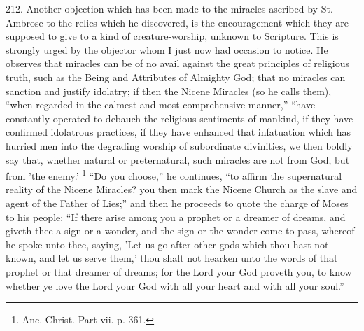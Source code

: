 212.
Another objection which has been made to the miracles ascribed by St.
Ambrose to the relics which he discovered, is the encouragement which
they are supposed to give to a kind of creature-worship, unknown to
Scripture. This is strongly urged by the objector whom I just now had
occasion to notice. He observes that miracles can be of no avail
against the great principles of religious truth, such as the Being and
Attributes of Almighty God; that no miracles can sanction and justify
idolatry; if then the Nicene Miracles (so he calls them), ``when
regarded in the calmest and most comprehensive manner,'' ``have
constantly operated to debauch the religious sentiments of mankind, if
they have confirmed idolatrous practices, if they have enhanced that
infatuation which has hurried men into the degrading worship of
subordinate divinities, we then boldly say that, whether natural or
preternatural, such miracles are not from God, but from 'the
enemy.' \footnote{Anc. Christ. Part vii. p. 361.} ``Do you choose,''
he continues, ``to affirm the supernatural reality of the Nicene
Miracles? you then mark the Nicene Church as the slave and agent of
the Father of Lies;'' and then he proceeds to quote the charge of Moses
to his people: ``If there arise among you a prophet or a dreamer of
dreams, and giveth thee a sign or a wonder, and the sign or the wonder
come to pass, whereof he spoke unto thee, saying, 'Let us go after
other gods which thou hast not known, and let us serve them,' thou
shalt not hearken unto the words of that prophet or that dreamer of
dreams; for the Lord your God proveth you, to know whether ye love the
Lord your God with all your heart and with all your soul.''


